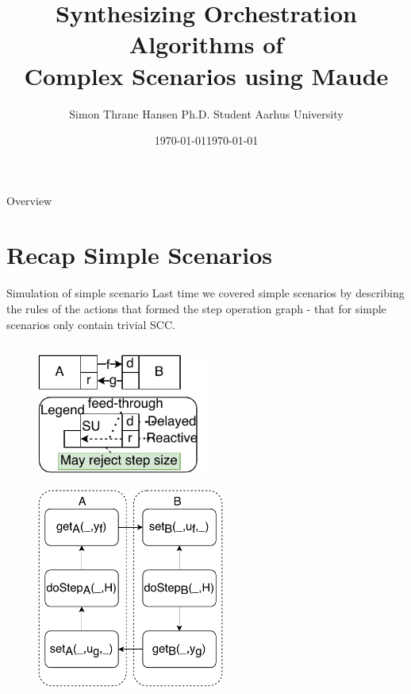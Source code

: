 \documentclass{beamer}
\title[Synthesizing OA in Maude] %
{Synthesizing Orchestration Algorithms of \\Complex Scenarios using Maude}
\date{\today}
\author[Thrane, S.] %
{Simon Thrane Hansen \newline Ph.D. Student \newline Aarhus University}
\date[AU 2021] %
{\today}
\begin{document}
\frame{\titlepage}

\begin{frame}{Overview}
    \tableofcontents
\end{frame}

\section{Recap Simple Scenarios}
\begin{frame}{Simulation of simple scenario}
    Last time we covered simple scenarios by describing the rules of the actions that formed the step operation graph - that for simple scenarios only contain trivial SCC.
    \begin{columns}[T] %
        \begin{column}{.48\textwidth}
            \begin{figure}    
                \includegraphics[width=0.5\textwidth]{images/simple_example.pdf}
            \end{figure}
            \begin{figure}
                \centering
                \includegraphics[width=0.55\textwidth]{images/simple_scenario_graph.pdf}
            \end{figure}
    \end{column}%

\end{columns}
\end{frame}
\end{document}
